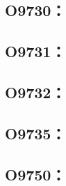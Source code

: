 \clearpage
\subsection{O9730：}



\clearpage
\subsection{O9731：}



\clearpage
\subsection{O9732：}



\clearpage
\subsection{O9735：}



\clearpage
\subsection{O9750：}



\clearpage
